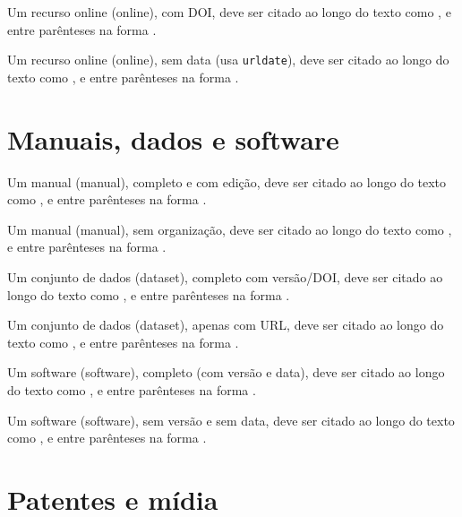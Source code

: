 \documentclass[a4paper,12pt]{article}
\begin{document}
Um recurso online (online), com DOI, deve ser citado ao longo do texto como \citet{online-1-with-doi}, e entre parênteses na forma \citep{online-1-with-doi}.


Um recurso online (online), sem data (usa \texttt{urldate}), deve ser citado ao longo do texto como \citet{online-2-url-only-no-date}, e entre parênteses na forma \citep{online-2-url-only-no-date}.



\section*{Manuais, dados e software}

Um manual (manual), completo e com edição, deve ser citado ao longo do texto como \citet{manual-1-complete}, e entre parênteses na forma \citep{manual-1-complete}.


Um manual (manual), sem organização, deve ser citado ao longo do texto como \citet{manual-2-missing-org}, e entre parênteses na forma \citep{manual-2-missing-org}.


Um conjunto de dados (dataset), completo com versão/DOI, deve ser citado ao longo do texto como \citet{dataset-1-complete-doi}, e entre parênteses na forma \citep{dataset-1-complete-doi}.


Um conjunto de dados (dataset), apenas com URL, deve ser citado ao longo do texto como \citet{dataset-2-url-only}, e entre parênteses na forma \citep{dataset-2-url-only}.


Um software (software), completo (com versão e data), deve ser citado ao longo do texto como \citet{soft-1-complete}, e entre parênteses na forma \citep{soft-1-complete}.


Um software (software), sem versão e sem data, deve ser citado ao longo do texto como \citet{soft-2-missing-version-date}, e entre parênteses na forma \citep{soft-2-missing-version-date}.



\section*{Patentes e mídia}
\end{document}
